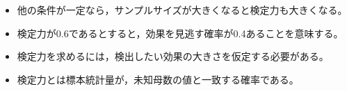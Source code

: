 \begin{itemize}
	\item 他の条件が一定なら，サンプルサイズが大きくなると検定力も大きくなる。
	\item 検定力が0.6であるとすると，効果を見逃す確率が0.4あることを意味する。
	\item 検定力を求めるには，検出したい効果の大きさを仮定する必要がある。
	\item 検定力とは標本統計量が，未知母数の値と一致する確率である。
\end{itemize}
